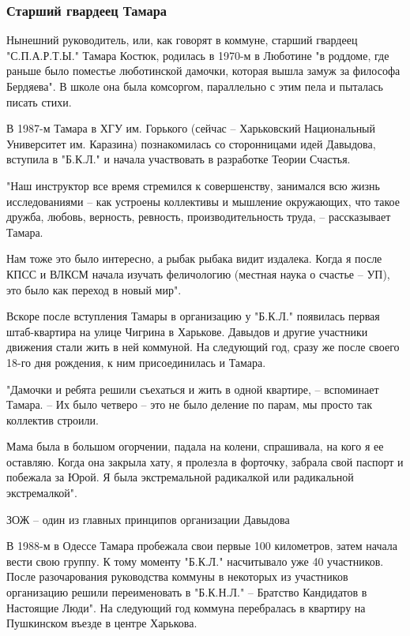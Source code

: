 \subsubsection{Старший гвардеец Тамара}

Нынешний руководитель, или, как говорят в коммуне, старший гвардеец
"С.П.А.Р.Т.Ы." Тамара Костюк, родилась в 1970-м в Люботине "в роддоме, где
раньше было поместье люботинской дамочки, которая вышла замуж за философа
Бердяева". В школе она была комсоргом, параллельно с этим пела и пыталась
писать стихи.

В 1987-м Тамара в ХГУ им. Горького (сейчас – Харьковский Национальный
Университет им. Каразина) познакомилась со сторонницами идей Давыдова, вступила
в "Б.К.Л." и начала участвовать в разработке Теории Счастья.

"Наш инструктор все время стремился к совершенству, занимался всю жизнь
исследованиями – как устроены коллективы и мышление окружающих, что такое
дружба, любовь, верность, ревность, производительность труда, – рассказывает
Тамара.

Нам тоже это было интересно, а рыбак рыбака видит издалека. Когда я после КПСС
и ВЛКСМ начала изучать феличологию (местная наука о счастье – УП), это было как
переход в новый мир".

Вскоре после вступления Тамары в организацию у "Б.К.Л." появилась первая
штаб-квартира на улице Чигрина в Харькове. Давыдов и другие участники движения
стали жить в ней коммуной. На следующий год, сразу же после своего 18-го дня
рождения, к ним присоединилась и Тамара.

"Дамочки и ребята решили съехаться и жить в одной квартире, – вспоминает
Тамара. – Их было четверо – это не было деление по парам, мы просто так
коллектив строили. 

Мама была в большом огорчении, падала на колени, спрашивала, на кого я ее
оставляю. Когда она закрыла хату, я пролезла в форточку, забрала свой паспорт и
побежала за Юрой. Я была экстремальной радикалкой или радикальной
экстремалкой".

ЗОЖ – один из главных принципов организации Давыдова

В 1988-м в Одессе Тамара пробежала свои первые 100 километров, затем начала
вести свою группу. К тому моменту "Б.К.Л." насчитывало уже 40 участников. После
разочарования руководства коммуны в некоторых из участников организацию решили
переименовать в "Б.К.Н.Л." – Братство Кандидатов в Настоящие Люди". На
следующий год коммуна перебралась в квартиру на Пушкинском въезде в центре
Харькова.

